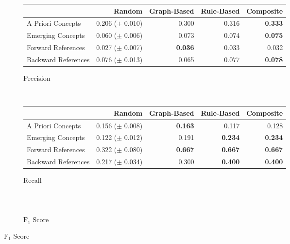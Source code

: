 \documentclass[12pt]{article}
\theoremstyle{grammarstyle}
\begin{document}
\begin{figure}[h]
    \centering
    \begin{subfigure}[b]{\textwidth}

        \caption{Precision}
        \label{fig:openie_precision}
        \centering
        \begin{tabular}{|l|r|r|r|r|}
            \hline
            {} & Random & Graph-Based & Rule-Based & Composite \\
            \hline
            A Priori Concepts & 0.206 ($\pm$ 0.010) & 0.300 & 0.316 &      \textbf{0.333} \\
            Emerging Concepts & 0.060 ($\pm$ 0.006) & 0.073 & 0.074 &      \textbf{0.075} \\
            \hline
            Forward References & 0.027 ($\pm$ 0.007) &        \textbf{0.036} & 0.033 & 0.032 \\
            Backward References & 0.076 ($\pm$ 0.013) & 0.065 & 0.077 &      \textbf{0.078} \\
            \hline
        \end{tabular}
    \end{subfigure} \\
    \begin{subfigure}[b]{\textwidth}
        \caption{Recall}
        \label{fig:openie_recall}
        \centering
        \begin{tabular}{|l|r|r|r|r|}
            \hline
            {} & Random & Graph-Based & Rule-Based & Composite \\
            \hline
            A Priori Concepts & 0.156 ($\pm$ 0.008) &        \textbf{0.163} & 0.117 & 0.128 \\
            Emerging Concepts & 0.122 ($\pm$ 0.012) & 0.191 &       \textbf{0.234} &      \textbf{0.234} \\
            \hline
            Forward References & 0.322 ($\pm$ 0.080) &        \textbf{0.667} &       \textbf{0.667} &     \textbf{ 0.667} \\
            Backward References & 0.217 ($\pm$ 0.034) & 0.300 &       \textbf{0.400} &      \textbf{0.400} \\
            \hline
        \end{tabular}
    \end{subfigure} \\
    \begin{subfigure}[b]{\textwidth}
        \caption{$\text{F}_1$ Score}
        \label{fig:openie_f1_score}
        \centering
        \begin{tabular}{|l|r|r|r|r|}

\end{tabular}
\end{subfigure}
\end{figure}
\end{document}
